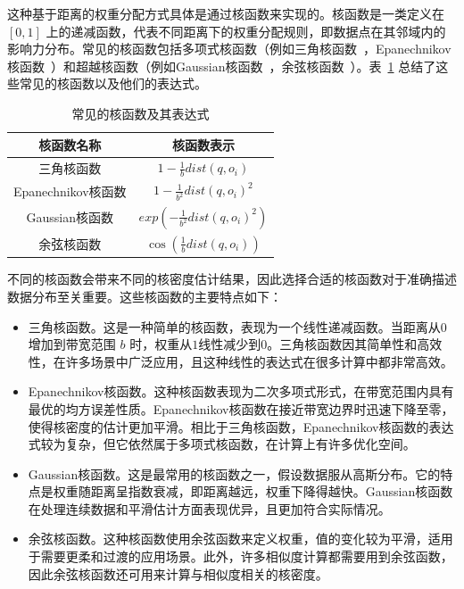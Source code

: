 这种基于距离的权重分配方式具体是通过核函数来实现的。核函数是一类定义在 $[0, 1]$ 上的递减函数，代表不同距离下的权重分配规则，即数据点在其邻域内的影响力分布。常见的核函数包括多项式核函数（例如三角核函数~\cite{fleuret_scale-invariance_2003, gong_estimating_2014}，Epanechnikov核函数~\cite{samiuddin_nonparametric_1990, bil_identification_2013}）和超越核函数（例如Gaussian核函数~\cite{scholkopf_comparing_1997, kristan_multivariate_2011}，余弦核函数~\cite{de_felice_short-term_2015}）。表~\ref{tab1} 总结了这些常见的核函数以及他们的表达式。

\begin{table}[!h]
	\centering
	\def\arraystretch{1.5}
	\caption{常见的核函数及其表达式}
	\label{tab1}
	\begin{tabular}{c|c}
		\hline
		核函数名称       & 核函数表示                                             \\ \hline \hline
		三角核函数 \cite{fleuret_scale-invariance_2003, gong_estimating_2014}   & $1-\frac{1}{b}dist(q,o_i)$         \\ 
		Epanechnikov核函数 \cite{samiuddin_nonparametric_1990, bil_identification_2013} & $1-\frac{1}{b^2}dist(q,o_i)^2$     \\ 
		Gaussian核函数 \cite{scholkopf_comparing_1997, kristan_multivariate_2011}     & $exp(-\frac{1}{b^2}dist(q,o_i)^2)$ \\ 
		余弦核函数 \cite{de_felice_short-term_2015}       & $\cos(\frac{1}{b}dist(q,o_i))$     \\ \hline
	\end{tabular}
\end{table}

不同的核函数会带来不同的核密度估计结果，因此选择合适的核函数对于准确描述数据分布至关重要。这些核函数的主要特点如下：
\begin{itemize}
	\item 三角核函数。这是一种简单的核函数，表现为一个线性递减函数。当距离从$0$增加到带宽范围 $b$ 时，权重从$1$线性减少到$0$。三角核函数因其简单性和高效性，在许多场景中广泛应用，且这种线性的表达式在很多计算中都非常高效。
	\item Epanechnikov核函数。这种核函数表现为二次多项式形式，在带宽范围内具有最优的均方误差性质。Epanechnikov核函数在接近带宽边界时迅速下降至零，使得核密度的估计更加平滑。相比于三角核函数，Epanechnikov核函数的表达式较为复杂，但它依然属于多项式核函数，在计算上有许多优化空间。
	\item Gaussian核函数。这是最常用的核函数之一，假设数据服从高斯分布。它的特点是权重随距离呈指数衰减，即距离越远，权重下降得越快。Gaussian核函数在处理连续数据和平滑估计方面表现优异，且更加符合实际情况。
	\item 余弦核函数。这种核函数使用余弦函数来定义权重，值的变化较为平滑，适用于需要更柔和过渡的应用场景。此外，许多相似度计算都需要用到余弦函数，因此余弦核函数还可用来计算与相似度相关的核密度。
\end{itemize}

